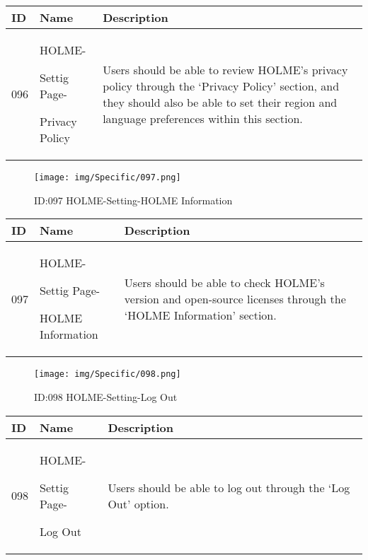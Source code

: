 \documentclass[conference]{IEEEtran}
\begin{document}
\begin{enumerate}
\begin{table}[h]
\begin{tabular}{|p{1cm}|p{1.8cm}|p{5.0cm}|}
        \hline
        ID & Name & Description\\ \hline
         096 \par  & HOLME-\par Settig Page- \par Privacy Policy& 
       	Users should be able to review HOLME's privacy policy through the `Privacy Policy' section, and they should also be able to set their region and language preferences within this section.
         \\ \hline
    \end{tabular}
\end{table}
\begin{figure}[h]
\centering                                         
\texttt{[image: img/Specific/097.png]}
\caption{ID:097 HOLME-Setting-HOLME Information}
\end{figure}
\begin{table}[h]
\def\arraystretch{1.2} \small
    \begin{tabular}{|p{1cm}|p{1.8cm}|p{5.0cm}|}
        \hline
        ID & Name & Description\\ \hline
         097 \par  & HOLME-\par Settig Page- \par HOLME Information& 
       	Users should be able to check HOLME's version and open-source licenses through the `HOLME Information' section.
         \\ \hline
    \end{tabular}
\end{table}
\clearpage


\begin{figure}[h]
\centering                                         
\texttt{[image: img/Specific/098.png]}
\caption{ID:098 HOLME-Setting-Log Out}
\end{figure}
\begin{table}[h]
\def\arraystretch{1.2} \small
    \begin{tabular}{|p{1cm}|p{1.8cm}|p{5.0cm}|}
        \hline
        ID & Name & Description\\ \hline
         098 \par  & HOLME-\par Settig Page- \par Log Out& 
       	Users should be able to log out through the `Log Out' option.
         \\ \hline
    \end{tabular}
\end{table}
\end{enumerate}
\end{document}

